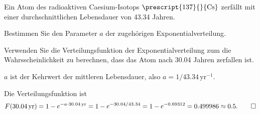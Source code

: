 Ein Atom des radioaktiven Caesium-Isotops $\prescript{137}{}{\text{Cs}}$ 
zerfällt mit einer durchschnittlichen Lebensdauer von 43.34 Jahren.
\begin{teilaufgaben}
\item
Bestimmen Sie den Parameter $a$ der zugehörigen Exponentialverteilung.
\item
Verwenden Sie die Verteilungsfunktion der Exponentialverteilung zum die
Wahrsscheinlichkeit zu berechnen, dass das Atom nach 30.04 Jahren
zerfallen ist.
\end{teilaufgaben}

\begin{loesung}
\begin{teilaufgaben}
\item
$a$ ist der Kehrwert der mittleren Lebensdauer, also
$a=1/43.34\,\text{yr}^{-1}$.
\item
Die Verteilungsfunktion ist
\[
F(30.04\,\text{yr})
=
1-e^{-a\cdot 30.04\,\text{yr}}
=
1-e^{-30.04/43.34}
=
1-e^{-0.69312}
=
0.499986
\approx
0.5.
\qedhere
\]
\end{teilaufgaben}
\end{loesung}
